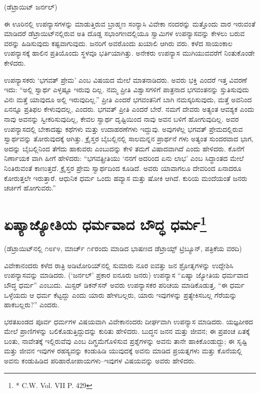 \delimiter

\begin{center}
(ಡೆಟ್ರಾಯಿಟ್​ ಜರ್ನಲ್​)
\end{center}

ಈ ಊರಿನಲ್ಲಿ ಉಪನ್ಯಾಸಗಳನ್ನು ಮಾಡುತ್ತಿರುವ ಬ್ರಾಹ್ಮಣ ಸಂನ್ಯಾಸಿ ವಿವೇಕಾ ನಂದರನ್ನು ಮತ್ತೊಂದು ವಾರ ಇರುವಂತೆ ಮಾಡಿದರೆ ಡೆಟ್ರಾಯಿಟ್​ನಲ್ಲಿರುವ ಅತಿ ದೊಡ್ಡ ಸಭಾಂಗಣದಲ್ಲಿಯೂ ಸ್ವಾಮಿಗಳ ಉಪನ್ಯಾಸವನ್ನು ಕೇಳಲು ಬರುವ ವರನ್ನು ಹಿಡಿಸುವುದು ಕಷ್ಟವಾಗುವುದು. ಜನರಿಗೆ ಅವರೊಂದು ಖಯಾಲಿ ಆಗಿರು ವರು. ಕಳೆದ ಸಾಯಂಕಾಲ ಉಪನ್ಯಾಸಕ್ಕೆ ಹಾಲಿನ ಪ್ರತಿಯೊಂದು ಸ್ಥಳವೂ ಭರ್ತಿಯಾಗಿತ್ತು. ಅನೇಕರು ಉಪನ್ಯಾಸ ಮುಗಿಯುವವರೆಗೆ ನಿಂತುಕೊಂಡೇ ಕೇಳಿದರು.

ಉಪನ್ಯಾಸಕರು ‘ಭಗವತ್​ ಪ್ರೇಮ’ ಎಂಬ ವಿಷಯದ ಮೇಲೆ ಮಾತನಾಡಿದರು. ಅವರು ಭಕ್ತಿ ಎಂದರೆ ಇತ್ತ ವಿವರಣೆ ಇದು: “ಅಲ್ಲಿ ಸ್ವಾರ್ಥ ಎಳ್ಳಷ್ಟೂ ಇರುವು ದಿಲ್ಲ. ನಮ್ಮ ಪ್ರೀತಿ ವಿಶ್ವಾಸಗಳಿಗೆ ಪಾತ್ರನಾದ ಭಗವಂತನನ್ನು ಸ್ತುತಿಸುವುದು ವಿನಃ ಮತ್ತೆ ಯಾವುದೂ ಅಲ್ಲಿ ಇರುವುದಿಲ್ಲ.” ಪ್ರೀತಿ ಎಂದರೆ ಭಗವಂತನಿಗೆ ಬಾಗಿ ನಮಸ್ಕರಿಸುವುದು, ಮತ್ತೆ ಅವನಿಂದ ಏನನ್ನೂ ಪ್ರತಿಫಲ ಕೇಳುವುದಲ್ಲ, ಎಂದರು. ಭಗವತ್​ ಪ್ರೀತಿ ಎಂದರೆ ಬೇರೆ. ನಮಗೆ ದೇವರು ಅತ್ಯಂತ ಆವಶ್ಯಕ ಎಂದು ನಾವು ಅವನನ್ನು ಸ್ವೀಕರಿಸುವುದಿಲ್ಲ, ಕೇವಲ ಸ್ವಾರ್ಥ ದೃಷ್ಟಿಯಿಂದ ನಾವು ಅವನ ಬಳಿಗೆ ಹೋಗುವುದಿಲ್ಲ. ಅವರ ಉಪನ್ಯಾಸದಲ್ಲಿ ಬೇಕಾದಷ್ಟು ಕಥೆಗಳು ಮತ್ತು ಉದಾಹರಣೆಗಳು ಇದ್ದುವು. ಅವುಗಳೆಲ್ಲ ಭಗವತ್​ ಪ್ರೇಮದಲ್ಲಿರುವ ಸ್ವಾರ್ಥವನ್ನು ತೋರುವುದಕ್ಕೆ ಆಗಿತ್ತು. ಕ್ರೈಸ್ತರ ಬೈಬಲ್ಲಿನಲ್ಲಿ ಸಾಲಮನ್ನನ ಪ್ರಾರ್ಥನೆ ಗಳು ಅತ್ಯಂತ ಸುಂದರವಾದ ಭಾಗ, ಅದನ್ನು ಬೈಬಲ್ಲಿನಿಂದ ತೆಗೆದು ಹಾಕುವರು ಎಂಬುದನ್ನು ಕೇಳಿ ತಮಗೆ ವಿಷಾದವಾಗಿದೆ ಎಂದು ಹೇಳಿದರು. ಕೊನೆಗೆ ನಿರ್ಣಾಯಕ ವಾಗಿ ಹೀಗೆ ಹೇಳಿದರು: “ಭಗವತ್ಪ್ರೀತಿಯು ‘ನನಗೆ ಅದರಿಂದ ಏನು ಲಾಭ’ ಎಂಬ ಸಿದ್ಧಾಂತದ ಮೇಲೆ ನಿಂತಿರುವಂತೆ ಕಾಣುತ್ತದೆ. ಕ್ರೈಸ್ತರ ಪ್ರೇಮ ಸ್ವಾರ್ಥದಿಂದ ಕೂಡಿದೆ. ಅವರು ಯಾವಾಗಲೂ ದೇವರಿಂದ ಏನಾದರೂ ಕೋರುತ್ತಲೇ ಇರುತ್ತಾರೆ. ಆಧುನಿಕ ಧರ್ಮ ಒಂದು ಹವ್ಯಾಸ ಮತ್ತು ಷೋಕಿ ಆಗಿದೆ. ಕುರಿಯ ಮಂದೆಯಂತೆ ಜನರು ಚರ್ಚಿಗೆ ಹೋಗುವರು.”


\section{ಏಷ್ಯಾಜ್ಯೋತಿಯ ಧರ್ಮವಾದ ಬೌದ್ಧ ಧರ್ಮ\protect\footnote{* C.W. Vol. VII P. 429}}

\begin{center}
(ಡೆಟ್ರಾಯಿಟ್​ನಲ್ಲಿ ೧೮೯೪, ಮಾರ್ಚ್​ ೧೯ರಂದು ಮಾಡಿದ ಭಾಷಣದ ಡೆಟ್ರಾಯ್ಟ್​ ಟ್ರಿಬ್ಯೂನ್​, ಪತ್ರಿಕೆಯ ವರದಿ)
\end{center}

ವಿವೇಕಾನಂದರು ಕಳೆದ ರಾತ್ರಿ ಅಡಿಟೋರಿಯ್​ನಲ್ಲಿ ಸುಮಾರು ನೂರ ಐವತ್ತು ಜನ ಶ್ರೋತೃಗಳನ್ನು ಉದ್ದೇಶಿಸಿ ಉಪನ್ಯಾಸವನ್ನು ಮಾಡಿದರು. (‘ಜರ್ನಲ್​’ ಪ್ರಕಾರ ಐನೂರು ಜನರು) ಉಪನ್ಯಾಸ “ಏಷ್ಯಾ ಜ್ಯೋತಿಯ ಧರ್ಮವಾದ ಬೌದ್ಧ ಧರ್ಮ” ಎಂಬುದು. ಮಿಸ್ಟರ್​ ಡಿಕನ್​ಸನ್​ ಅವರು ಉಪನ್ಯಾಸಕರ ಪರಿಚಯ ಮಾಡಿಕೊಡುತ್ತ, “ಈ ಧರ್ಮ ಒಳ್ಳೆಯದು ಆ ಧರ್ಮ ಕೆಟ್ಟದ್ದು ಎಂದು ಯಾರು ಹೇಳಬಲ್ಲರು, ಯಾರು ಇವುಗಳನ್ನು ಪ್ರತ್ಯೇಕಿಸಬಲ್ಲ ಗೆರೆಯನ್ನು ಹಾಕಬಲ್ಲರು?” ಎಂದರು.

ಭರತಖಂಡದ ಪೂರ್ವ ಧರ್ಮಗಳ ವಿಷಯವಾಗಿ ವಿವೇಕಾನಂದರು ದೀರ್ಘವಾಗಿ ಉಪನ್ಯಾಸ ಮಾಡಿದರು. ಯಜ್ಞಪೀಠದ ಮೇಲೆ ಪ್ರಾಣಿಗಳನ್ನು ಬಲಿಕೊಡುತ್ತಿದ್ದುದನ್ನು ಕುರಿತು ಹೇಳಿದರು. ಬುದ್ಧನ ಜನನ ಮತ್ತು ಜೀವನ; ಈ ಪ್ರಪಂಚ ಏತಕ್ಕೆ ಬಂತು, ನಾವೇತಕ್ಕೆ ಇಲ್ಲಿರುವೆವು ಎಂಬ ದಿಗ್ಭ್ರಮೆಗೊಳಿಸುವ ಪ್ರಶ್ನೆಗಳನ್ನು ಅವನು ತಾನೇ ಹಾಕಿಕೊಂಡುದ್ದು; ಈ ಸೃಷ್ಟಿ ಮತ್ತು ಜೀವನ ಇವುಗಳ ರಹಸ್ಯವನ್ನು ಕಂಡುಹಿಡಿ ಯುವುದಕ್ಕೆ ಅವನು ಮಾಡಿದ ಪ್ರಯತ್ನಗಳು ಮತ್ತು ಕೊನೆಯಲ್ಲಿ ಅವನು ಕಂಡುಹಿಡಿದ ಪರಿಹಾರೋಪಾಯಗಳು–ಇವುಗಳ ವಿಷಯವನ್ನು ಅವರು ಹೇಳಿದರು.

